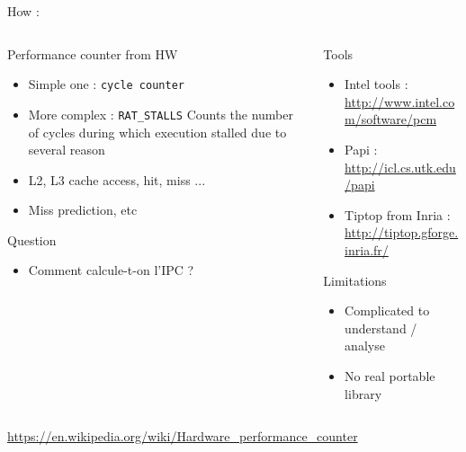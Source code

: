 \begin{Frame}{How : }
  \begin{columns}[t]
    \begin{column}{\BW} %
      \begin{block}{Performance counter from HW}
        \begin{itemize}
        \item Simple one : \texttt{cycle counter}
        \item More complex : \texttt{RAT\_STALLS} Counts the number of cycles during which execution stalled due to several reason
        \item L2, L3 cache access, hit, miss ...
        \item Miss prediction, etc
        \end{itemize}
      \end{block} 
      \begin{alertblock}{Question}
        \begin{itemize}
        \item Comment calcule-t-on l'IPC ?
        \end{itemize}
      \end{alertblock}
    \end{column}
    
    \begin{column}{\BW} %
      \begin{block}{Tools}
        \begin{itemize}
        \item Intel tools : \url{http://www.intel.com/software/pcm}
        \item Papi : \url{http://icl.cs.utk.edu/papi}
        \item Tiptop from Inria : \url{http://tiptop.gforge.inria.fr/}
        \end{itemize}
      \end{block}   
      \begin{alertblock}{Limitations}
        \begin{itemize}
        \item Complicated to understand / analyse
        \item No real portable library
        \end{itemize}
      \end{alertblock}   
    \end{column}
  \end{columns}  
\url{https://en.wikipedia.org/wiki/Hardware_performance_counter}
\end{Frame}


